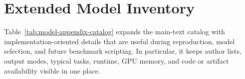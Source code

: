 \section{Extended Model Inventory}

Table~\ref{tab:model-appendix-catalog} expands the main-text catalog with implementation-oriented details that are useful during reproduction, model selection, and future benchmark scripting. In particular, it keeps author lists, output modes, typical tasks, runtime, GPU memory, and code or artifact availability visible in one place.


